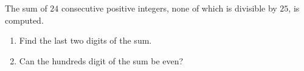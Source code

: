 The sum of $24$ consecutive positive integers, none of which is divisible by $25$, is computed.
\begin{enumerate}
\item[(a)] Find the last two digits of the sum.
\item[(b)] Can the hundreds digit of the sum be even?
\end{enumerate}
